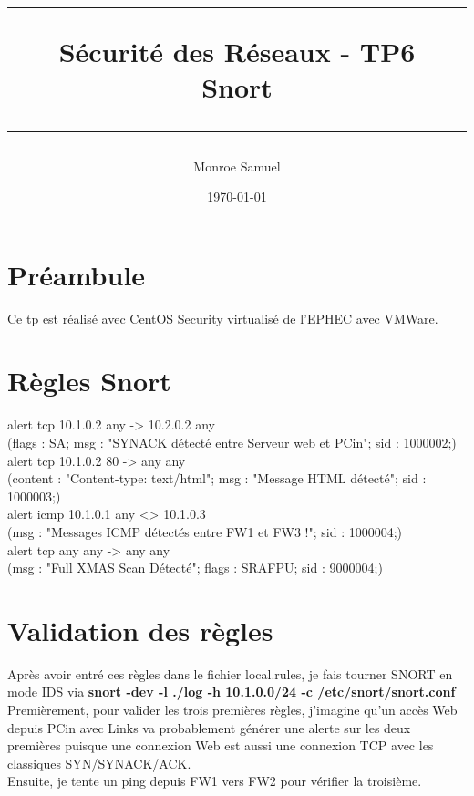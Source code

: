 \documentclass[a4paper,10pt,final,fleqn]{article}
\title{
\parbox{15cm}
{ %
  \vspace{3cm}
	\begin{center}\sf\bfseries\Huge
		\rule{15cm}{1pt}
		\medskip
		Sécurité des Réseaux - TP6 \\
		\huge Snort
		\vspace{.5cm}
		\rule{15cm}{1pt}
	\end{center}
	\vspace{3cm}
 }}
\author{Monroe Samuel}
\date{\today}
\begin{document}
\maketitle
\newpage

	\section{Préambule}

		Ce tp est réalisé avec CentOS Security virtualisé de l'EPHEC avec VMWare.

	\section{Règles Snort}

		alert tcp 10.1.0.2 any -> 10.2.0.2 any\\
		(flags : SA; msg : "SYNACK détecté entre Serveur web et PCin"; sid : 1000002;)\\

		alert tcp 10.1.0.2 80 -> any any\\
		(content : "Content-type: text/html"; msg : "Message HTML détecté"; sid : 1000003;)\\

		alert icmp 10.1.0.1 any <> 10.1.0.3\\
		(msg : "Messages ICMP détectés entre FW1 et FW3 !"; sid : 1000004;)\\

		alert tcp any any -> any any \\
		(msg : "Full XMAS Scan Détecté"; flags : SRAFPU; sid : 9000004;)\\

	\section{Validation des règles}

		Après avoir entré ces règles dans le fichier local.rules, je fais tourner SNORT en mode IDS via \textbf{snort -dev -l ./log -h 10.1.0.0/24 -c /etc/snort/snort.conf}\\

		Premièrement, pour valider les trois premières règles, j'imagine qu'un accès Web depuis PCin avec Links va probablement générer une alerte sur les deux premières puisque une connexion Web est aussi une connexion TCP avec les classiques SYN/SYNACK/ACK.\\
		Ensuite, je tente un ping depuis FW1 vers FW2 pour vérifier la troisième.\\
\end{document}
